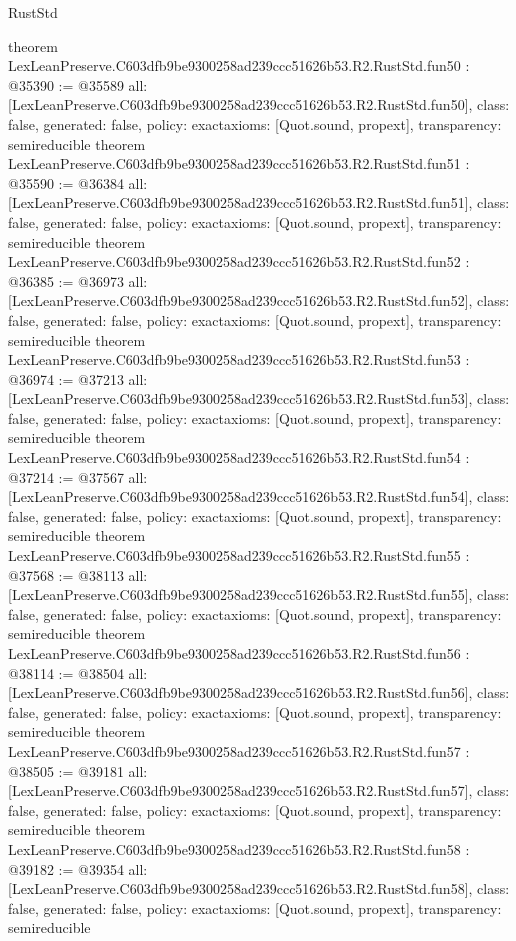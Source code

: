 \begin{lexlean}{RustStd}
\begin{coremodule}
{}
theorem LexLeanPreserve.C603dfb9be9300258ad239ccc51626b53.R2.RustStd.fun50 : @35390 := @35589 {
  all: [LexLeanPreserve.C603dfb9be9300258ad239ccc51626b53.R2.RustStd.fun50],
  class: false,
  generated: false,
  policy: exact{axioms: [Quot.sound, propext]},
  transparency: semireducible
}
theorem LexLeanPreserve.C603dfb9be9300258ad239ccc51626b53.R2.RustStd.fun51 : @35590 := @36384 {
  all: [LexLeanPreserve.C603dfb9be9300258ad239ccc51626b53.R2.RustStd.fun51],
  class: false,
  generated: false,
  policy: exact{axioms: [Quot.sound, propext]},
  transparency: semireducible
}
theorem LexLeanPreserve.C603dfb9be9300258ad239ccc51626b53.R2.RustStd.fun52 : @36385 := @36973 {
  all: [LexLeanPreserve.C603dfb9be9300258ad239ccc51626b53.R2.RustStd.fun52],
  class: false,
  generated: false,
  policy: exact{axioms: [Quot.sound, propext]},
  transparency: semireducible
}
theorem LexLeanPreserve.C603dfb9be9300258ad239ccc51626b53.R2.RustStd.fun53 : @36974 := @37213 {
  all: [LexLeanPreserve.C603dfb9be9300258ad239ccc51626b53.R2.RustStd.fun53],
  class: false,
  generated: false,
  policy: exact{axioms: [Quot.sound, propext]},
  transparency: semireducible
}
theorem LexLeanPreserve.C603dfb9be9300258ad239ccc51626b53.R2.RustStd.fun54 : @37214 := @37567 {
  all: [LexLeanPreserve.C603dfb9be9300258ad239ccc51626b53.R2.RustStd.fun54],
  class: false,
  generated: false,
  policy: exact{axioms: [Quot.sound, propext]},
  transparency: semireducible
}
theorem LexLeanPreserve.C603dfb9be9300258ad239ccc51626b53.R2.RustStd.fun55 : @37568 := @38113 {
  all: [LexLeanPreserve.C603dfb9be9300258ad239ccc51626b53.R2.RustStd.fun55],
  class: false,
  generated: false,
  policy: exact{axioms: [Quot.sound, propext]},
  transparency: semireducible
}
theorem LexLeanPreserve.C603dfb9be9300258ad239ccc51626b53.R2.RustStd.fun56 : @38114 := @38504 {
  all: [LexLeanPreserve.C603dfb9be9300258ad239ccc51626b53.R2.RustStd.fun56],
  class: false,
  generated: false,
  policy: exact{axioms: [Quot.sound, propext]},
  transparency: semireducible
}
theorem LexLeanPreserve.C603dfb9be9300258ad239ccc51626b53.R2.RustStd.fun57 : @38505 := @39181 {
  all: [LexLeanPreserve.C603dfb9be9300258ad239ccc51626b53.R2.RustStd.fun57],
  class: false,
  generated: false,
  policy: exact{axioms: [Quot.sound, propext]},
  transparency: semireducible
}
theorem LexLeanPreserve.C603dfb9be9300258ad239ccc51626b53.R2.RustStd.fun58 : @39182 := @39354 {
  all: [LexLeanPreserve.C603dfb9be9300258ad239ccc51626b53.R2.RustStd.fun58],
  class: false,
  generated: false,
  policy: exact{axioms: [Quot.sound, propext]},
  transparency: semireducible
}
\end{coremodule}
\end{lexlean}

